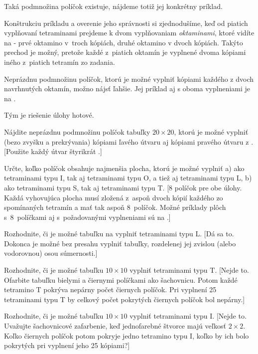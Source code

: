 {%
Taká podmnožina políčok existuje, nájdeme totiž jej konkrétny
príklad.

Konštrukciu príkladu a overenie jeho správnosti si zjednodušíme,
keď od piatich vyplňovaní tetraminami prejdeme k dvom vyplňovaniam
{\it oktaminami}, ktoré vidíte na \obr{} - prvé oktamino v~troch kópiách, druhé oktamino v dvoch kópiách.
Takýto prechod je možný, pretože každé z~piatich oktamín
je vyplnené dvoma kópiami iného z~piatich tetramín zo zadania.
%

Neprázdnu podmnožinu políčok, ktorú je možné vyplniť kópiami
každého z dvoch navrhnutých oktamín, možno nájsť ľahšie.
Jej príklad aj s oboma vyplneniami je na \obr{}.
%

Tým je riešenie úlohy hotové.


Nájdite neprázdnu podmnožinu políčok tabuľky $20\times20$,
ktorú je možné vyplniť (bezo zvyšku a prekrývania)
kópiami ľavého útvaru aj kópiami pravého útvaru z \obr{}.
%
[Použite každý útvar štyrikrát .]

Určte, koľko políčok obsahuje najmenšia plocha, ktorú je možné vyplniť
a) ako tetraminami typu I, tak aj tetraminami typu O, a tiež aj
tetraminami typu L,
b) ako tetraminami typu S, tak aj tetraminami typu T.
[8 políčok pre obe úlohy. Každá vyhovujúca plocha musí zložená
z~aspoň dvoch kópií každého zo spomínaných tetramín
a mať tak aspoň 8~políčok.
Možné príklady plôch s~8~políčkami aj s~požadovanými vyplneniami
%
sú na \obr{}.]

\D
Rozhodnite, či je možné tabuľku na \obr{} vyplniť
tetraminami typu L.
%
[Dá sa to. Dokonca je možné bez presahu vyplniť  tabuľky,
rozdelenej jej zvislou (alebo vodorovnou) osou súmernosti.]

Rozhodnite, či je možné tabuľku $10\times 10$ vyplniť
tetraminami typu T.
[Nejde to. Ofarbite tabuľku bielymi a čiernymi políčkami ako
šachovnicu. Potom každé tetramino T pokrýva nepárny počet čiernych políčok.
Pri vyplnení 25 tetraminami typu T by celkový počet
pokrytých čiernych políčok bol nepárny.]

Rozhodnite, či je možné tabuľku $10\times 10$ vyplniť tetraminami
typu I.
[Nejde to. Uvažujte  šachovnicové zafarbenie,
keď jednofarebné štvorce majú veľkosť $2 \times 2$. Koľko
čiernych políčok potom pokryje jedno tetramino typu I, koľko
by ich bolo pokrytých pri vyplnení jeho 25 kópiami?]

}
